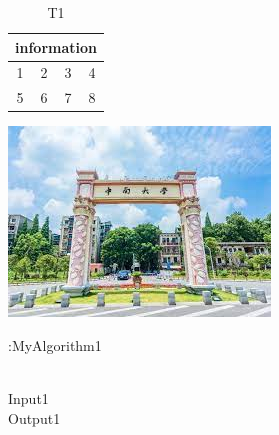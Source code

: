 \documentclass{article}
\begin{document}
\begin{table}
\caption{T1}
\centering
\begin{tabular}{cccc}
\hline
\multicolumn{4}{c}{information}\\
\hline
1&2&3&4\\
5&6&7&8\\
\hline
\end{tabular}
\end{table}

\includegraphics{csu}


\begin{algorithm}[htb] 
\caption{:MyAlgorithm1} 
\label{alg:Framwork} 
\begin{algorithmic}[1] 
\REQUIRE ~~\\ 
Input1
\ENSURE ~~\\ 
Output1
\ENDIF
\ENDFOR
\end{algorithmic}
\end{algorithm}
\end{document}
